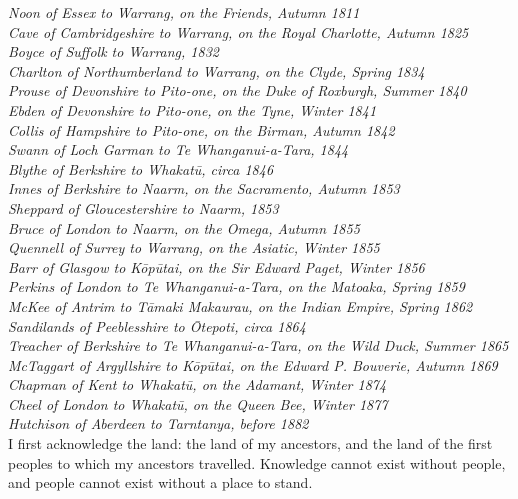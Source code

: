 \textit{Noon of Essex to Warrang, on the Friends, Autumn 1811} \\[5pt]
\textit{Cave of Cambridgeshire to Warrang, on the Royal Charlotte, Autumn 1825} \\[5pt]
\textit{Boyce of Suffolk to Warrang, 1832} \\[5pt] 
\textit{Charlton of Northumberland to Warrang, on the Clyde, Spring 1834} \\[5pt]
\textit{Prouse of Devonshire to Pito-one, on the Duke of Roxburgh, Summer 1840} \\[5pt]
\textit{Ebden of Devonshire to Pito-one, on the Tyne, Winter 1841} \\[5pt]
\textit{Collis of Hampshire to Pito-one, on the Birman, Autumn 1842} \\[5pt]
\textit{Swann of Loch Garman to Te Whanganui-a-Tara, 1844} \\[5pt] 
\textit{Blythe of Berkshire to Whakatū, circa 1846} \\[5pt]
\textit{Innes of Berkshire to Naarm, on the Sacramento, Autumn 1853} \\[5pt]
\textit{Sheppard of Gloucestershire to Naarm, 1853} \\[5pt] 
\textit{Bruce of London to Naarm, on the Omega, Autumn 1855} \\[5pt]
\textit{Quennell of Surrey to Warrang, on the Asiatic, Winter 1855} \\[5pt]
\textit{Barr of Glasgow to Kōpūtai, on the Sir Edward Paget, Winter 1856} \\[5pt] 
\textit{Perkins of London to Te Whanganui-a-Tara, on the Matoaka, Spring 1859} \\[5pt]
\textit{McKee of Antrim to Tāmaki Makaurau, on the Indian Empire, Spring 1862} \\[5pt]
\textit{Sandilands of Peeblesshire to Ōtepoti, circa 1864} \\[5pt] 
\textit{Treacher of Berkshire to Te Whanganui-a-Tara, on the Wild Duck, Summer 1865} \\[5pt]
\textit{McTaggart of Argyllshire to Kōpūtai, on the Edward P. Bouverie, Autumn 1869} \\[5pt] 
\textit{Chapman of Kent to Whakatū, on the Adamant, Winter 1874} \\[5pt]
\textit{Cheel of London to Whakatū, on the Queen Bee, Winter 1877} \\[5pt]  
\textit{Hutchison of Aberdeen to Tarntanya, before 1882} \\[5pt] 
I first acknowledge the land: the land of my ancestors, and the land of the first peoples to which my ancestors travelled. Knowledge cannot exist without people, and people cannot exist without a place to stand.\\[5pt]
